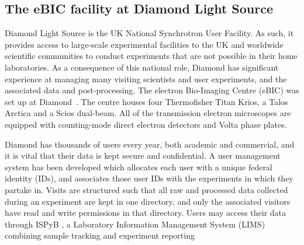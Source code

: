 
\subsection{The eBIC facility at Diamond Light Source}

Diamond Light Source is the UK National Synchrotron User Facility.  As such, it provides access to large-scale experimental facilities to the UK and worldwide scientific communities to conduct experiments that are not possible in their home laboratories.  As a consequence of this national role, Diamond has significant experience at managing many visiting scientists and user experiments, and the associated data and post-processing.  %
The electron Bio-Imaging Centre (eBIC) was set up at Diamond~\citep{diamond2017}. The centre houses four Thermofisher Titan Krios, a Talos Arctica and a Scios dual-beam. All of the transmission electron microscopes are equipped with counting-mode direct electron detectors and Volta phase plates. 

Diamond has thousands of users every year, both academic and commercial, and it is vital that their data is kept secure and confidential. A user management system has been developed which allocates each user with a unique federal identity (IDs), and associates those user IDs with the experiments in which they partake in. Visits are structured such that all raw and processed data collected during an experiment are kept in one directory, and only the associated visitors have read and write permissions in that directory. Users may access their data through ISPyB \citep{ispb2011},  a Laboratory Information Management System (LIMS) combining sample tracking and experiment reporting  %


